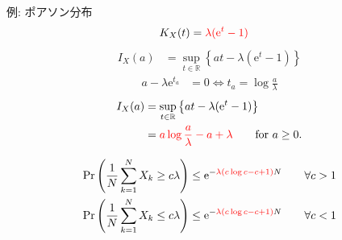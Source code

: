 \documentclass[lualatex,handout]{beamer}
\newcommand{\emm}[1]{\textcolor{red}{#1}}
\theoremstyle{definition}
\begin{document}
\begin{frame}{例: ポアソン分布}
\begin{align*}
K_X(t) &= \emm{\lambda(\mathrm{e}^t-1)}
\end{align*}
\begin{align*}
I_X(a)&=\sup_{t\in\mathbb{R}}\left\{at - \lambda(\mathrm{e}^t-1)\right\}
\end{align*}
\begin{align*}
a-\lambda\mathrm{e}^{t_a} &= 0\iff t_a = \log \frac{a}{\lambda}
\end{align*}
\begin{align*}
I_X(a)&=\sup_{t\in\mathbb{R}}\left\{at - \lambda(\mathrm{e}^t-1)\right\}\\
 &= \emm{a\log\frac{a}{\lambda} -a + \lambda} \qquad\text{for } a \ge 0.
\end{align*}

\vspace{.5em}
\begin{align*}
\Pr\left(\frac1N\sum_{k=1}^N X_k \ge c\lambda\right) &\le \mathrm{e}^{-\emm{\lambda\left(c\log c -c + 1 \right)}N}\qquad\forall c > 1\\
\Pr\left(\frac1N\sum_{k=1}^N X_k \le c\lambda\right) &\le \mathrm{e}^{-\emm{\lambda\left(c\log c -c + 1 \right)}N}\qquad\forall c < 1\\
\end{align*}
\end{frame}
\end{document}
